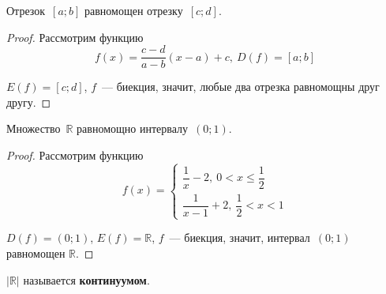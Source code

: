 \begin{statement}
Отрезок~$[a; b]$ равномощен отрезку~$[c; d]$.
\end{statement}
\begin{proof}
Рассмотрим функцию
\begin{equation*}
f(x) = \frac{c - d}{a - b} (x - a) + c, \ D(f) = [a; b]
\end{equation*}

$E(f) = [c; d]$, $f$~--- биекция, значит, любые два отрезка равномощны друг другу.
\end{proof}

\begin{statement}
Множество~$\mathbb R$ равномощно интервалу~$(0; 1)$.
\end{statement}
\begin{proof}
Рассмотрим функцию
\begin{equation*}
f(x) =
\begin{cases}
\dfrac1x - 2, \ 0 < x \leqslant \dfrac12 \\
\dfrac1{x - 1} + 2, \ \dfrac12 < x < 1
\end{cases}
\end{equation*}

$D(f) = (0; 1)$, $E(f) = \mathbb R$, $f$~--- биекция, значит, интервал~$(0; 1)$ равномощен $\mathbb R$.
\end{proof}

$|\mathbb R|$ называется \textbf{континуумом}.